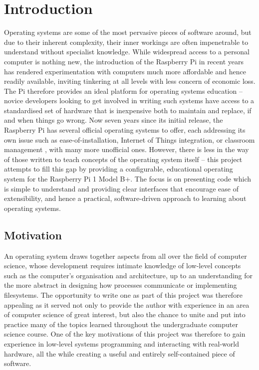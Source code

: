 \section{Introduction}
    Operating systems are some of the most pervasive pieces of software around,
    but due to their inherent complexity, their inner workings are often
    impenetrable to understand without specialist knowledge. While widespread
    access to a personal computer is nothing new, the introduction of the
    Raspberry Pi in recent years has rendered experimentation with computers
    much more affordable and hence readily available, inviting tinkering at all
    levels with less concern of economic loss. The Pi therefore provides an
    ideal platform for operating systems education -- novice developers looking
    to get involved in writing such systems have access to a standardised set of
    hardware that is inexpensive both to maintain and replace, if and when
    things go wrong. Now seven years since its initial release, the Raspberry
    Pi has several official operating systems to offer, each addressing its own
    issue such as ease-of-installation, Internet of Things integration, or
    classroom management \cite{OSes}, with many more unofficial ones. However,
    there is less in the way of those written to teach concepts of the operating
    system itself -- this project attempts to fill this gap by providing a
    configurable, educational operating system for the Raspberry Pi 1 Model B+.
    The focus is on presenting code which is simple to understand and providing
    clear interfaces that encourage ease of extensibility, and hence a
    practical, software-driven approach to learning about operating systems.

\subsection{Motivation}
    An operating system draws together aspects from all over the field of
    computer science, whose development requires intimate knowledge of low-level
    concepts such as the computer's organisation and architecture, up to an
    understanding for the more abstract in designing how processes communicate
    or implementing filesystems. The opportunity to write one as part of this
    project was therefore appealing as it served not only to provide the author
    with experience in an area of computer science of great interest,
    but also the chance to unite and put into practice many of the topics
    learned throughout the undergraduate computer science course. One of the key
    motivations of this project was therefore to gain experience in low-level
    systems programming and interacting with real-world hardware, all the while
    creating a useful and entirely self-contained piece of software.

